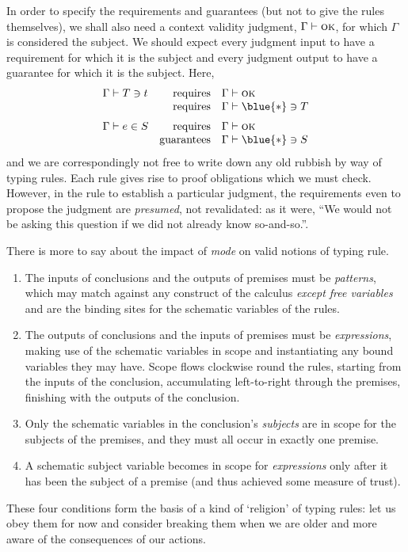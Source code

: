 \documentclass[natbib]{article}
\newcommand{\type}{\blue{\ast}}
\newcommand{\VALID}[1]{#1 \vdash \textsc{ok}}
\begin{document}
In order to specify the requirements and guarantees (but not to give the rules themselves), we shall also
need a context validity judgment, $\VALID\Gamma$, for which $\Gamma$ is considered the subject.
We should expect every judgment input to have a requirement for which it is the subject and every judgment output to have a guarantee for which it is the subject. Here,
\[\begin{array}{lrl}
\CHK\Gamma Tt & \mbox{requires} & \VALID\Gamma \\
              & \mbox{requires} & \CHK\Gamma \type T \medskip \\
\SYN\Gamma eS & \mbox{requires} & \VALID\Gamma \\
              & \mbox{guarantees} & \CHK\Gamma \type S
\end{array}\]
and we are correspondingly not free to write down any old rubbish by way of typing rules. Each rule gives
rise to proof obligations which we must check. However, in the rule to establish a particular judgment,
the requirements even to propose the judgment are \emph{presumed}, not revalidated: as it were, ``We would not be asking this question if we did not already know so-and-so.''.

There is more to say about the impact of \emph{mode} on valid notions of typing rule.
\begin{enumerate}
\item The inputs of conclusions and the outputs of premises must be
\emph{patterns}, which may match against any construct of the calculus
\emph{except free variables} and are the binding sites for the
schematic variables of the rules.
\item The outputs of conclusions and the inputs of premises must
be \emph{expressions}, making use of the schematic variables in scope
and instantiating any bound variables they may have. Scope flows
clockwise round the rules, starting from the inputs of the conclusion,
accumulating left-to-right through the premises, finishing with the
outputs of the conclusion.
\item Only the schematic variables in the conclusion's \emph{subjects} are
in scope for the subjects of the premises, and they must all occur in exactly one premise.
\item A schematic subject variable becomes in scope for \emph{expressions} only after it has been the subject of a premise (and thus achieved some measure of trust).
\end{enumerate}
These four conditions form the basis of a kind of `religion' of typing
rules: let us obey them for now and consider breaking them when we are
older and more aware of the consequences of our actions.
\end{document}
